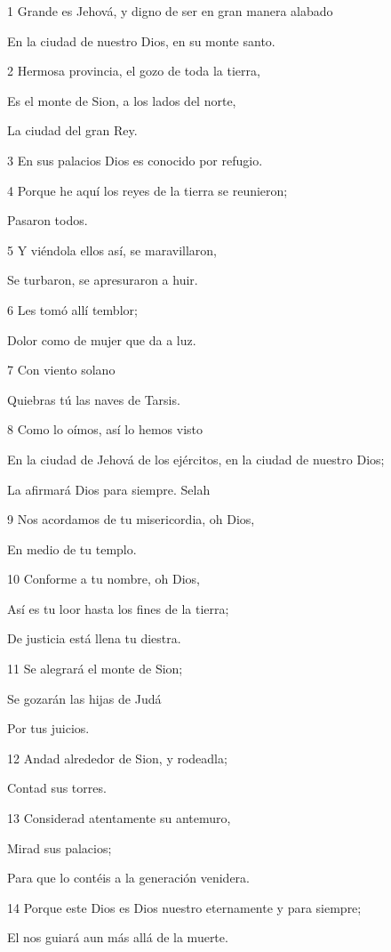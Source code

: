 \par 1 Grande es Jehová, y digno de ser en gran manera alabado
\par En la ciudad de nuestro Dios, en su monte santo.
\par 2 Hermosa provincia, el gozo de toda la tierra,
\par Es el monte de Sion, a los lados del norte,
\par La ciudad del gran Rey.
\par 3 En sus palacios Dios es conocido por refugio.
\par 4 Porque he aquí los reyes de la tierra se reunieron;
\par Pasaron todos.
\par 5 Y viéndola ellos así, se maravillaron,
\par Se turbaron, se apresuraron a huir.
\par 6 Les tomó allí temblor;
\par Dolor como de mujer que da a luz.
\par 7 Con viento solano
\par Quiebras tú las naves de Tarsis.
\par 8 Como lo oímos, así lo hemos visto
\par En la ciudad de Jehová de los ejércitos, en la ciudad de nuestro Dios;
\par La afirmará Dios para siempre. Selah
\par 9 Nos acordamos de tu misericordia, oh Dios,
\par En medio de tu templo.
\par 10 Conforme a tu nombre, oh Dios,
\par Así es tu loor hasta los fines de la tierra;
\par De justicia está llena tu diestra.
\par 11 Se alegrará el monte de Sion;
\par Se gozarán las hijas de Judá
\par Por tus juicios.
\par 12 Andad alrededor de Sion, y rodeadla;
\par Contad sus torres.
\par 13 Considerad atentamente su antemuro,
\par Mirad sus palacios;
\par Para que lo contéis a la generación venidera.
\par 14 Porque este Dios es Dios nuestro eternamente y para siempre;
\par El nos guiará aun más allá de la muerte.

